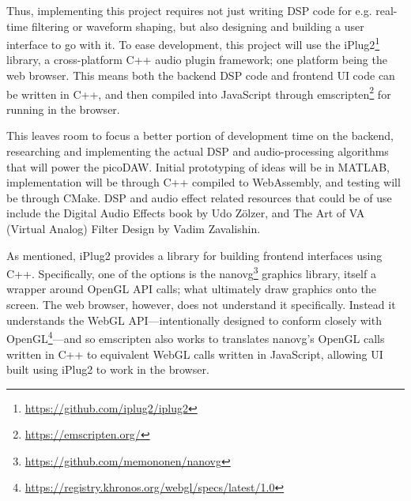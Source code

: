 Thus, implementing this project requires not just writing DSP code for e.g. 
real-time filtering or waveform shaping, but also designing and building a 
user interface to go with it. To ease development, this project will use the 
iPlug2\footnote{\url{https://github.com/iplug2/iplug2}} library, a 
cross-platform C++ audio plugin framework; one platform being the web 
browser. This means both the backend DSP code and frontend UI code can be written in 
C++, and then compiled into JavaScript through emscripten\footnote{\url{https://emscripten.org/}} 
for running in the browser.

This leaves room to focus a better portion of development time on the backend, 
researching and implementing the actual DSP and audio-processing algorithms 
that will power the picoDAW. Initial prototyping of ideas will be in MATLAB, 
implementation will be through C++ compiled to WebAssembly, and testing will be 
through CMake. DSP and audio effect related resources that could be of use include 
the Digital Audio Effects book by Udo Zölzer\cite{dafx}, and The Art of VA (Virtual Analog)
Filter Design by Vadim Zavalishin\cite{va_filter}.

As mentioned, iPlug2 provides a library for building frontend interfaces using 
C++. Specifically, one of the options is the nanovg\footnote{\url{https://github.com/memononen/nanovg}} 
graphics library, itself a wrapper around OpenGL API calls; what ultimately draw graphics onto 
the screen. The web browser, however, does not understand it specifically. Instead it 
understands the WebGL API---intentionally designed to conform closely with OpenGL\footnote{\url{https://registry.khronos.org/webgl/specs/latest/1.0}}---and 
so emscripten also works to translates nanovg's OpenGL calls written in C++ to equivalent 
WebGL calls written in JavaScript, allowing UI built using iPlug2 to work in the browser.